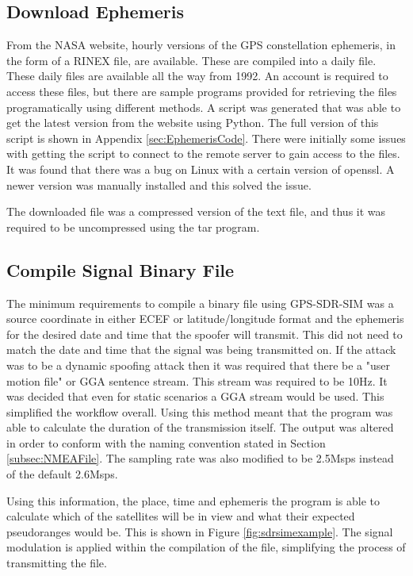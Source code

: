\subsection{Download Ephemeris}
From the NASA website, hourly versions of the GPS constellation ephemeris, in the form of a RINEX file, are available. These are compiled into a daily file. These daily
files are available all the way from 1992. An account is required to access these files, but there are sample programs provided for retrieving
the files programatically using different methods. A script was generated that was able to get the latest version from the website using Python. The full version of this
script is shown in Appendix \ref{sec:EphemerisCode}. There were initially some
issues with getting the script to connect to the remote server to gain access to the files. It was found that there was a bug on Linux with a certain version of openssl.
A newer version was manually installed and this solved the issue.

The downloaded file was a compressed version of the text file, and thus it was required to be uncompressed using the tar program.

\subsection{Compile Signal Binary File}
The minimum requirements to compile a binary file using GPS-SDR-SIM was a source coordinate in either ECEF or latitude/longitude format and the ephemeris for the desired date and time that the spoofer
will transmit. This did not need to match the date and time that the signal was being transmitted on. If the attack was to be a dynamic spoofing attack then it was
required that there be a "user motion file" or GGA sentence stream. This stream was required to be 10Hz. It was decided that even for static scenarios a GGA stream would
be used. This simplified the workflow overall. Using this method meant that the program was able to calculate the duration of the transmission itself. The output was
altered in order to conform with the naming convention stated in Section \ref{subsec:NMEAFile}. The sampling rate was also modified to be 2.5Msps instead of the default 2.6Msps.

Using this information, the place, time and ephemeris the program is able to calculate which of the satellites will be in view and what their expected pseudoranges would
be. This is shown in Figure \ref{fig:sdrsimexample}.
The signal modulation is applied within the compilation of the file, simplifying the process of transmitting the file. 

